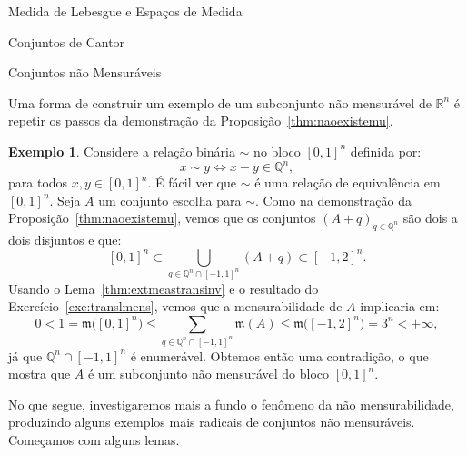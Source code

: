 \documentclass[oneside,final,11pt]{amsbook}
\newcommand{\R}{\mathds R}
\newcommand{\Q}{\mathds Q}
\newcommand{\leb}{\mathfrak m}
\theoremstyle{remark}\newtheorem{exercise}{Exercício}[chapter]
\theoremstyle{remark}\newtheorem{*exercise}[exercise]{\hbox to 0pt{\hskip 0pt minus 1fil*}Exercício}
\theoremstyle{definition}\newtheorem{exdefin}{Definição}[chapter]
\theoremstyle{plain}\newtheorem{teo}{Teorema}[section]
\theoremstyle{plain}\newtheorem{lem}[teo]{Lema}
\theoremstyle{plain}\newtheorem{prop}[teo]{Proposição}
\theoremstyle{plain}\newtheorem{cor}[teo]{Corolário}
\theoremstyle{definition}\newtheorem{defin}[teo]{Definição}
\theoremstyle{remark}\newtheorem{rem}[teo]{Observação}
\theoremstyle{definition}\newtheorem{notation}[teo]{Notação}
\theoremstyle{definition}\newtheorem{convention}[teo]{Convenção}
\theoremstyle{definition}\newtheorem{example}[teo]{Exemplo}
\numberwithin{section}{chapter}
\numberwithin{equation}{section}
\begin{document}
\begin{chapter}{Medida de Lebesgue e Espaços de Medida}
\begin{section}{Conjuntos de Cantor}
\end{section}

\begin{section}{Conjuntos não Mensuráveis}

Uma forma de construir um exemplo de um subconjunto não mensurável de $\R^n$ é repetir os passos da demonstração
da Proposição~\ref{thm:naoexistemu}.
\begin{example}
Considere a relação binária $\sim$ no bloco $[0,1]^n$ definida por:
\[x\sim y\Longleftrightarrow x-y\in\Q^n,\]
para todos $x,y\in[0,1]^n$. É fácil ver que $\sim$ é uma relação de equivalência em $[0,1]^n$.
Seja $A$ um conjunto escolha para $\sim$. Como na demonstração da Proposição~\ref{thm:naoexistemu},
vemos que os conjuntos $(A+q)_{q\in\Q^n}$ são dois a dois disjuntos e que:
\[[0,1]^n\subset\!\!\!\!\!\!\!\!\!\bigcup_{q\in\Q^n\cap[-1,1]^n}\!\!\!\!\!\!(A+q)\subset[-1,2]^n.\]
Usando o Lema~\ref{thm:extmeastransinv} e o resultado do Exercício~\ref{exe:translmens}, vemos que
a mensurabilidade de $A$ implicaria em:
\[0<1=\leb\big([0,1]^n\big)\le\!\!\!\!\!\!\!\!\!\sum_{q\in\Q^n\cap[-1,1]^n}\!\!\!\!\!\!\leb(A)\le\leb\big([-1,2]^n\big)=3^n<+\infty,\]
já que $\Q^n\cap[-1,1]^n$ é enumerável. Obtemos então uma contradição, o que mostra que $A$ é um subconjunto
não mensurável do bloco $[0,1]^n$.
\end{example}

No que segue, investigaremos mais a fundo o fenômeno da não mensurabilidade, produzindo alguns exemplos mais
radicais de conjuntos não mensuráveis. Começamos com alguns lemas.


\end{section}
\end{chapter}
\end{document}
